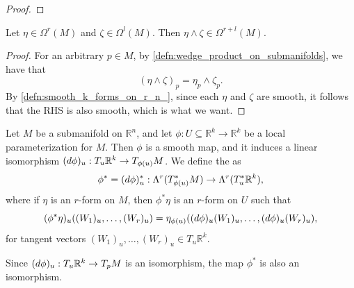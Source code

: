 \documentclass[notoc,notitlepage]{tufte-book}
\begin{document}
\begin{proof}
\end{proof}

\begin{propo}\label{propo:smoothness_of_wedge_products_on_submanifolds}
  Let $\eta \in \Omega^r(M)$ and $\zeta \in \Omega^l(M)$. Then $\eta \land \zeta
  \in \Omega^{r+l}(M)$.
\end{propo}

\begin{proof}
  For an arbitrary $p \in M$, by \cref{defn:wedge_product_on_submanifolds}, we
  have that
  \begin{equation*}
    (\eta \land \zeta)_p = \eta_p \land \zeta_p.
  \end{equation*}
  By \cref{defn:smooth_k_forms_on_r_n_}, since each $\eta$ and $\zeta$ are
  smooth, it follows that the RHS is also smooth, which is what we want.
\end{proof}

\begin{defn}\label{defn:pullback_maps_on_submanifolds}
  Let $M$ be a submanifold on $\mathbb{R}^n$, and let $\phi : U \subseteq
  \mathbb{R}^k \to \mathbb{R}^k$ be a local parameterization for $M$. Then $\phi$ 
  is a smooth map, and it induces a linear isomorphism $(\mathop{}\!d{\phi})_u : T_u
  \mathbb{R}^k \to T_{\phi(u)} M$. We define the  as
  \begin{equation*}
    \phi^* = (\mathop{}\!d{\phi})_u^* : \Lambda^r(T_{\phi(u)}^* M) \to \Lambda^r(T_u^*
    \mathbb{R}^k),
  \end{equation*}
  where if $\eta$ is an $r$-form on $M$, then $\phi^* \eta$ is an $r$-form on
  $U$ such that
  \begin{equation}\label{eq:pullback_maps_on_submanifolds}
    (\phi^* \eta)_u((W_1)_u, \ldots, (W_r)_u) = \eta_{\phi(u)} ((\mathop{}\!d{\phi})_u
    (W_1)_u, \ldots, (\mathop{}\!d{\phi})_u(W_r)_u),
  \end{equation}
  for tangent vectors $(W_1)_u, \ldots, (W_r)_u \in T_u \mathbb{R}^k$.
\end{defn}

\begin{note}
  Since $(\mathop{}\!d{\phi})_u : T_u \mathbb{R}^k \to T_p M$ is an isomorphism, the map
  $\phi^*$ is also an isomorphism.
\end{note}

\end{document}
